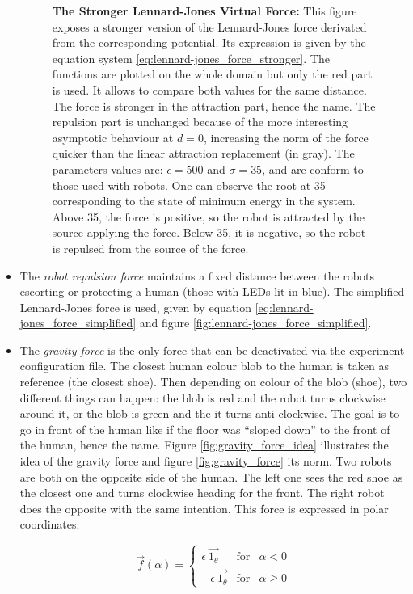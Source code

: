 \documentclass[oneside, a4paper, 12pt]{memoir}
\let\oldCaption\caption
\renewcommand{\caption}[2]{
\oldCaption[#1]{{\small\sffamily\bfseries #1:} #2}
}
\begin{document}
\begin{itemize}
\begin{figure}
						\caption{The Stronger Lennard-Jones Virtual Force}{This figure exposes a stronger version of the Lennard-Jones force derivated from the corresponding potential. Its expression is given by the equation system \ref{eq:lennard-jones_force_stronger}. The functions are plotted on the whole domain but only the red part is used. It allows to compare both values for the same distance. The force is stronger in the attraction part, hence the name. The repulsion part is unchanged because of the more interesting asymptotic behaviour at $d=0$, increasing the norm of the force quicker than the linear attraction replacement (in gray). The parameters values are: $\epsilon=500$ and $\sigma=35$, and are conform to those used with robots. One can observe the root at 35 corresponding to the state of minimum energy in the system. Above 35, the force is positive, so the robot is attracted by the source applying the force. Below 35, it is negative, so the robot is repulsed from the source of the force.}
						\label{fig:lennard-jones_force_stronger}
					\end{figure}
				
				\item The \emph{robot repulsion force} maintains a fixed distance between the robots escorting or protecting a human (those with LEDs lit in blue). The simplified Lennard-Jones force is used, given by equation \ref{eq:lennard-jones_force_simplified} and figure \ref{fig:lennard-jones_force_simplified}.
				\item The \emph{gravity force} is the only force that can be deactivated via the experiment configuration file. The closest human colour blob to the human is taken as reference (the closest shoe). Then depending on colour of the blob (shoe), two different things can happen: the blob is red and the robot turns clockwise around it, or the blob is green and the it turns anti-clockwise. The goal is to go in front of the human like if the floor was \enquote{sloped down} to the front of the human, hence the name. Figure \ref{fig:gravity_force_idea} illustrates the idea of the gravity force and figure \ref{fig:gravity_force} its norm. Two robots are both on the opposite side of the human. The left one sees the red shoe as the closest one and turns clockwise heading for the front. The right robot does the opposite with the same intention. This force is expressed in polar coordinates:
				
				\begin{equation}
					\vec{f}(\alpha) = \left\{ \begin{array}{rcl}
						\epsilon ~\vec{1_\theta} & \mbox{for} & \alpha < 0 \\
						-\epsilon ~\vec{1_\theta} & \mbox{for} & \alpha \geq 0
						\end{array}\right.
				\end{equation}
				

\end{itemize}
\end{document}

